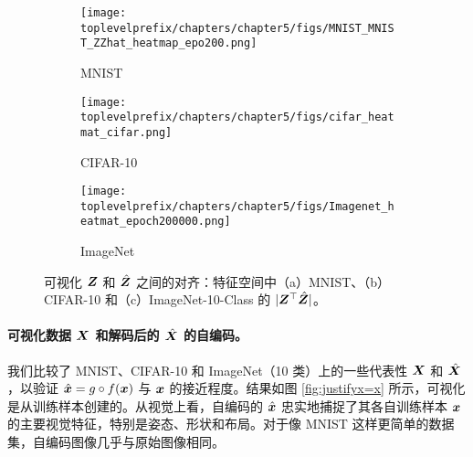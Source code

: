 \documentclass[../../book-main_zh.tex]{subfiles}
\begin{document}
\begin{figure}[t]
    \begin{subfigure}[t]{0.3\textwidth}
        \centering
        \texttt{[image: \\toplevelprefix/chapters/chapter5/figs/MNIST\_MNIST\_ZZhat\_heatmap\_epo200.png]}
        \caption{MNIST}
    \end{subfigure}
    \hfill
    \begin{subfigure}[t]{0.3\textwidth}
        \centering
        \texttt{[image: \\toplevelprefix/chapters/chapter5/figs/cifar\_heatmat\_cifar.png]}
        \caption{CIFAR-10}
    \end{subfigure}
    \hfill
    \begin{subfigure}[t]{0.3\textwidth}
        \centering
        \texttt{[image: \\toplevelprefix/chapters/chapter5/figs/Imagenet\_heatmat\_epoch200000.png]}
        \caption{ImageNet}
    \end{subfigure}
    \caption{可视化 $\bm{Z}$ 和 $\hat{\bm{Z}}$ 之间的对齐：特征空间中（a）MNIST、（b）CIFAR-10 和（c）ImageNet-10-Class 的 $|\bm{Z}^\top \hat{\bm{Z}}|$。}
    \label{fig:justifyz=z}
\end{figure}
 





\paragraph{可视化数据 $\bm{X}$ 和解码后的 $\hat {\bm{X}}$ 的自编码。} 我们比较了 MNIST、CIFAR-10 和 ImageNet（10 类）上的一些代表性 $\bm{X}$ 和 $\hat{\bm{X}}$，以验证 $\hat {\bm{x}} = g\circ f(\bm{x})$ 与 $\bm{x}$ 的接近程度。结果如图 \ref{fig:justifyx=x} 所示，可视化是从训练样本创建的。从视觉上看，自编码的 $\hat {\bm{x}}$ 忠实地捕捉了其各自训练样本 $\bm{x}$ 的主要视觉特征，特别是姿态、形状和布局。对于像 MNIST 这样更简单的数据集，自编码图像几乎与原始图像相同。
\end{document}
